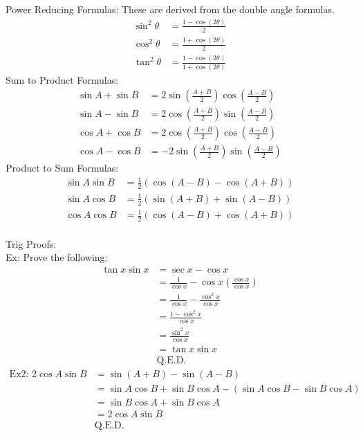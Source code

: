 Power Reducing Formulas:
These are derived from the double angle formulas.
\begin{align*}
    \sin^2\theta&=\frac{1-\cos(2\theta)}{2}\\
    \cos^2\theta&=\frac{1+\cos(2\theta)}{2}\\
    \tan^2\theta&=\frac{1-\cos(2\theta)}{1+\cos(2\theta)}
\end{align*}
Sum to Product Formulas:
\begin{align*}
    \sin A+\sin B&=2\sin\left(\frac{A+B}{2}\right)\cos\left(\frac{A-B}{2}\right)\\
    \sin A-\sin B&=2\cos\left(\frac{A+B}{2}\right)\sin\left(\frac{A-B}{2}\right)\\
    \cos A+\cos B&=2\cos\left(\frac{A+B}{2}\right)\cos\left(\frac{A-B}{2}\right)\\
    \cos A-\cos B&=-2\sin\left(\frac{A+B}{2}\right)\sin\left(\frac{A-B}{2}\right)
\end{align*}
Product to Sum Formulas:
\begin{align*}
    \sin A\sin B&=\frac{1}{2}(\cos(A-B)-\cos(A+B))\\
    \sin A\cos B&=\frac{1}{2}(\sin(A+B)+\sin(A-B))\\
    \cos A\cos B&=\frac{1}{2}(\cos(A-B)+\cos(A+B))
\end{align*}
\\
Trig Proofs:\\
Ex: Prove the following:
\begin{align*}
    \tan x\sin x&=\sec x-\cos x\\
    &=\frac{1}{\cos x}-\cos x\left(\frac{\cos x}{\cos x}\right)\\
    &=\frac{1}{\cos x}-\frac{\cos^2x}{\cos x}\\
    &=\frac{1-\cos^2x}{\cos x}\\
    &=\frac{\sin^2x}{\cos x}\\
    &=\tan x\sin x\\
    &\text{Q.E.D.}
\end{align*}
\begin{align*}
    \text{Ex2: }2\cos A\sin B&=\sin(A+B)-\sin(A-B)\\
    &=\sin A\cos B+\sin B\cos A-(\sin A\cos B-\sin B\cos A)\\
    &=\sin B\cos A+\sin B\cos A\\
    &=2\cos A\sin B\\
    &\text{Q.E.D.}
\end{align*}

